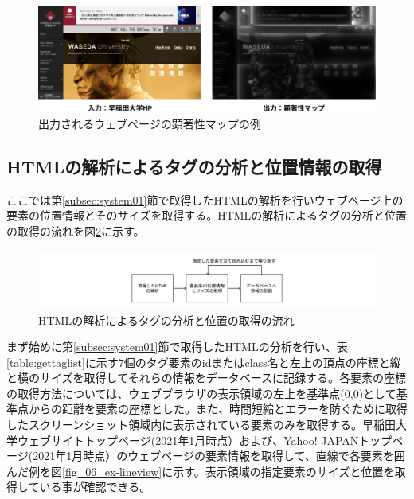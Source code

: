 \begin{figure}[H]
  \centering
  \includegraphics[width=12cm]{figures/06_ex-saliencymap}
  \caption{出力されるウェブページの顕著性マップの例}
  \label{fig_06_example_saliencymap}
\end{figure}


\subsection{HTMLの解析によるタグの分析と位置情報の取得}\label{subsec:system02}
\par ここでは第\ref{subsec:system01}節で取得したHTMLの解析を行いウェブページ上の要素の位置情報とそのサイズを取得する。HTMLの解析によるタグの分析と位置の取得の流れを図\ref{fig_system02}に示す。

\begin{figure}[H]
    \centering
    \includegraphics[width=12cm]{figures/06_process02.jpg}
    \caption{HTMLの解析によるタグの分析と位置の取得の流れ}
    \label{fig_system02}
\end{figure}

\par まず始めに第\ref{subsec:system01}節で取得したHTMLの分析を行い、表\ref{table:gettaglist}に示す7個のタグ要素のidまたはclass名と左上の頂点の座標と縦と横のサイズを取得してそれらの情報をデータベースに記録する。各要素の座標の取得方法については、ウェブブラウザの表示領域の左上を基準点(0,0)として基準点からの距離を要素の座標とした。また、時間短縮とエラーを防ぐために取得したスクリーンショット領域内に表示されている要素のみを取得する。早稲田大学ウェブサイトトップページ(2021年1月時点）\cite{waseda_top}および、Yahoo! JAPANトップページ(2021年1月時点）\cite{yahoo}のウェブページの要素情報を取得して、直線で各要素を囲んだ例を図\ref{fig_06_ex-lineview}に示す。表示領域の指定要素のサイズと位置を取得している事が確認できる。

